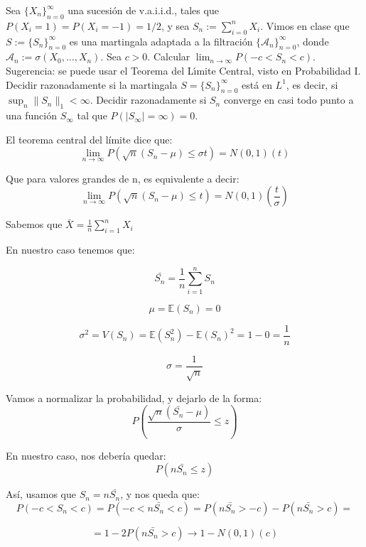 \begin{problem}[4]  Sea $\{X_n\}_{n=0}^{\infty}$ una sucesi\'on de v.a.i.i.d., tales que 
$P(X_i = 1)= P(X_i = -1) = 1/2$, y sea $S_n := \sum_{i=0}^n X_i$.
Vimos en clase que $S := \{S_n\}_{n=0}^{\infty}$  es una martingala adaptada a la filtraci\'on
$\{\mathcal{A}_n\}_{n=0}^{\infty}$, donde $\mathcal{A}_n := \sigma(X_0, \dots, X_n)$.
Sea $c > 0$. 
Calcular $\lim_{n\to \infty} P( -c < S_n < c)$. Sugerencia: se puede usar el Teorema del L\'{\i}mite Central,
visto en Probabilidad I.
 Decidir razonadamente si la martingala $S = \{S_n\}_{n=0}^{\infty}$ 
 est\'a en $L^1$, es decir, si $\sup_n \|S_n\|_1 < \infty$. Decidir razonadamente
si $S_n$ converge en casi todo punto a una funci\'on $S_ \infty$ tal que
$P(|S_\infty| = \infty) = 0$. 

\solution

\begin{expla}
El teorema central del límite dice que:
\[
\lim_{n \rightarrow \infty} P(\sqrt{n}(S_n - \mu) \leq \sigma t) = N(0,1)(t)
\]

Que para valores grandes de n, es equivalente a decir:
\[
\lim_{n \rightarrow \infty} P(\sqrt{n}(S_n - \mu) \leq t) = N(0,1)(\frac{t}{\sigma})
\]

Sabemos que $\bar{X} = \frac{1}{n} \sum_{i=1}^{n}X_i$

\end{expla}

En nuestro caso tenemos que:

\[
\bar{S_n} = \frac{1}{n} \sum_{i=1}^{n}S_n
\]

\[
\mu = \mathbb{E}(S_n)= 0
\]

\[
\sigma^2 = V(S_n) = \mathbb{E}(S_n^2)-\mathbb{E}(S_n)^2 = 1 - 0 = \frac{1}{n} 
\]

\[
\sigma = \frac{1}{\sqrt{n}}
\]


Vamos a normalizar la probabilidad, y dejarlo de la forma:
\[
P(\frac{\sqrt{n}(\bar{S_n}-\mu)}{\sigma} \leq z)
\]

En nuestro caso, nos debería quedar:
\[
P(n\bar{S_n}\leq z)
\]


Así, usamos que $S_n = n\bar{S_n}$, y nos queda que:
\[
P(-c<S_n<c)=P(-c<n\bar{S_n}<c)=P(n\bar{S_n}>-c)-P(n\bar{S_n}>c)=
\]

\[
=1-2P(n\bar{S_n}>c) \rightarrow 1-N(0,1)(c)
\]



\end{problem}


